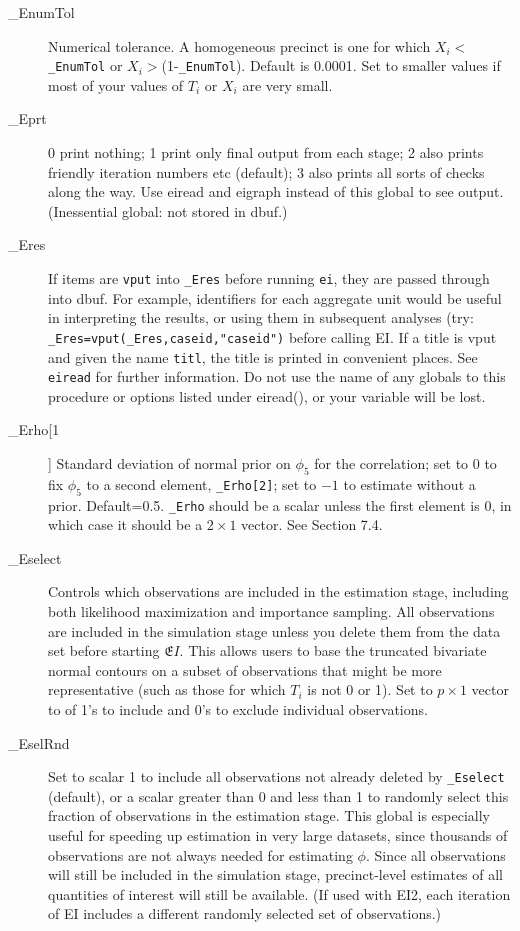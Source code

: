 \documentclass[11pt,titlepage]{article}
\newcommand{\EI}{\ensuremath{{\mathfrak EI}}}
\begin{document}
\begin{description}
\item[\_EnumTol] Numerical tolerance.  A homogeneous precinct is one
  for which $X_i<$\texttt{\_EnumTol} or $X_i>$(1-\texttt{\_EnumTol}).
  Default is 0.0001.  Set to smaller values if most of your values of
  $T_i$ or $X_i$ are very small.

\item[\_Eprt] 0 print nothing; 1 print only final output from each
  stage; 2 also prints friendly iteration numbers etc (default); 3
  also prints all sorts of checks along the way.  Use eiread and
  eigraph instead of this global to see output.  (Inessential global:
  not stored in dbuf.)

\item[\_Eres] If items are \texttt{vput} into \texttt{\_Eres} before
  running \texttt{ei}, they are passed through into dbuf.  For
  example, identifiers for each aggregate unit would be useful in
  interpreting the results, or using them in subsequent analyses (try:
  \texttt{\_Eres=vput(\_Eres,caseid,"caseid")} before calling EI.  If
  a title is vput and given the name \texttt{titl}, the title is
  printed in convenient places.  See \texttt{eiread} for further
  information.  Do not use the name of any globals to this procedure
  or options listed under eiread(), or your variable will be lost.

\item[\_Erho[1]] Standard deviation of normal prior on $\phi_5$ for
  the correlation; set to 0 to fix $\phi_5$ to a second element,
  \texttt{\_Erho[2]}; set to $-1$ to estimate without a prior.
  Default=0.5.  \texttt{\_Erho} should be a scalar unless the first
  element is 0, in which case it should be a $2\times 1$ vector.  See
  Section 7.4.

\item[\_Eselect] Controls which observations are included in the
  estimation stage, including both likelihood maximization and
  importance sampling. All observations are included in the simulation
  stage unless you delete them from the data set before starting \EI.
  This allows users to base the truncated bivariate normal contours on
  a subset of observations that might be more representative (such as
  those for which $T_i$ is not 0 or 1).  Set to $p\times 1$ vector to
  of 1's to include and 0's to exclude individual observations.

\item[\_EselRnd] Set to scalar 1 to include all observations not
  already deleted by \texttt{\_Eselect} (default), or a scalar greater
  than 0 and less than 1 to randomly select this fraction of
  observations in the estimation stage.  This global is especially
  useful for speeding up estimation in very large datasets, since
  thousands of observations are not always needed for estimating
  $\phi$.  Since all observations will still be included in the
  simulation stage, precinct-level estimates of all quantities of
  interest will still be available.  (If used with EI2, each iteration
  of EI includes a different randomly selected set of observations.)


\end{description}
\end{document}

